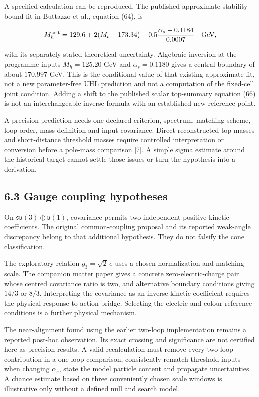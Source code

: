 \documentclass[
  11pt,
  a4paper,
]{article}
\begin{document}
A specified calculation can be reproduced. The published approximate stability-bound fit in Buttazzo et al., equation (64), is

\[M_h^{\rm crit}=129.6+2(M_t-173.34)
-0.5\frac{\alpha_s-0.1184}{0.0007}\quad\text{GeV},\]

with its separately stated theoretical uncertainty. Algebraic inversion at the programme inputs \(M_h=125.20\) GeV and \(\alpha_s=0.1180\) gives a central boundary of about \(170.997\) GeV. This is the conditional value of that existing approximate fit, not a new parameter-free UHL prediction and not a computation of the fixed-cell joint condition. Adding a shift to the published scalar top-summary equation (66) is not an interchangeable inverse formula with an established new reference point.

A precision prediction needs one declared criterion, spectrum, matching scheme, loop order, mass definition and input covariance. Direct reconstructed top masses and short-distance threshold masses require controlled interpretation or conversion before a pole-mass comparison {[}7{]}. A simple sigma estimate around the historical target cannot settle those issues or turn the hypothesis into a derivation.

\subsection{6.3 Gauge coupling hypotheses}\label{gauge-coupling-hypotheses}

On \(\mathfrak{su}(3)\oplus\mathfrak u(1)\), covariance permits two independent positive kinetic coefficients. The original common-coupling proposal and its reported weak-angle discrepancy belong to that additional hypothesis. They do not falsify the cone classification.

The exploratory relation \(g_3=\sqrt2\,e\) uses a chosen normalization and matching scale. The companion matter paper gives a concrete zero-electric-charge pair whose centred covariance ratio is two, and alternative boundary conditions giving \(14/3\) or \(8/3\). Interpreting the covariance as an inverse kinetic coefficient requires the physical response-to-action bridge. Selecting the electric and colour reference conditions is a further physical mechanism.

The near-alignment found using the earlier two-loop implementation remains a reported post-hoc observation. Its exact crossing and significance are not certified here as precision results. A valid recalculation must remove every two-loop contribution in a one-loop comparison, consistently rematch threshold inputs when changing \(\alpha_s\), state the model particle content and propagate uncertainties. A chance estimate based on three conveniently chosen scale windows is illustrative only without a defined null and search model.
\end{document}
